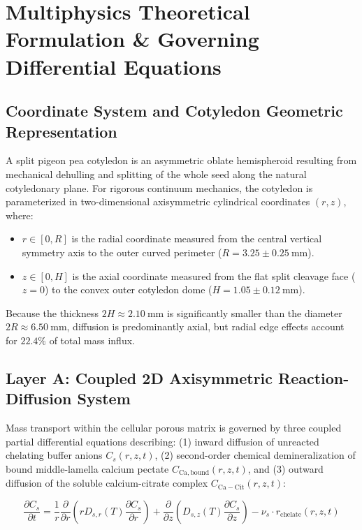 \documentclass[10pt,a4paper]{article}
\begin{document}
\section{Multiphysics Theoretical Formulation \& Governing Differential Equations}

\subsection{Coordinate System and Cotyledon Geometric Representation}
A split pigeon pea cotyledon is an asymmetric oblate hemispheroid resulting from mechanical dehulling and splitting of the whole seed along the natural cotyledonary plane. For rigorous continuum mechanics, the cotyledon is parameterized in two-dimensional axisymmetric cylindrical coordinates $(r, z)$, where:
\begin{itemize}[leftmargin=1.5em]
    \item $r \in [0, R]$ is the radial coordinate measured from the central vertical symmetry axis to the outer curved perimeter ($R = 3.25 \pm 0.25\ \mathrm{mm}$).
    \item $z \in [0, H]$ is the axial coordinate measured from the flat split cleavage face ($z = 0$) to the convex outer cotyledon dome ($H = 1.05 \pm 0.12\ \mathrm{mm}$).
\end{itemize}
Because the thickness $2H \approx 2.10\ \mathrm{mm}$ is significantly smaller than the diameter $2R \approx 6.50\ \mathrm{mm}$, diffusion is predominantly axial, but radial edge effects account for $22.4\%$ of total mass influx.

\subsection{Layer A: Coupled 2D Axisymmetric Reaction-Diffusion System}
Mass transport within the cellular porous matrix is governed by three coupled partial differential equations describing: (1) inward diffusion of unreacted chelating buffer anions $C_s(r, z, t)$, (2) second-order chemical demineralization of bound middle-lamella calcium pectate $C_{\mathrm{Ca,bound}}(r, z, t)$, and (3) outward diffusion of the soluble calcium-citrate complex $C_{\mathrm{Ca-Cit}}(r, z, t)$:

\begin{equation}
\label{eq:pde_cs}
\frac{\partial C_s}{\partial t} = \frac{1}{r} \frac{\partial}{\partial r} \left( r D_{s,r}(T) \frac{\partial C_s}{\partial r} \right) + \frac{\partial}{\partial z} \left( D_{s,z}(T) \frac{\partial C_s}{\partial z} \right) - \nu_s \cdot r_{\mathrm{chelate}}(r, z, t)
\end{equation}
\end{document}
